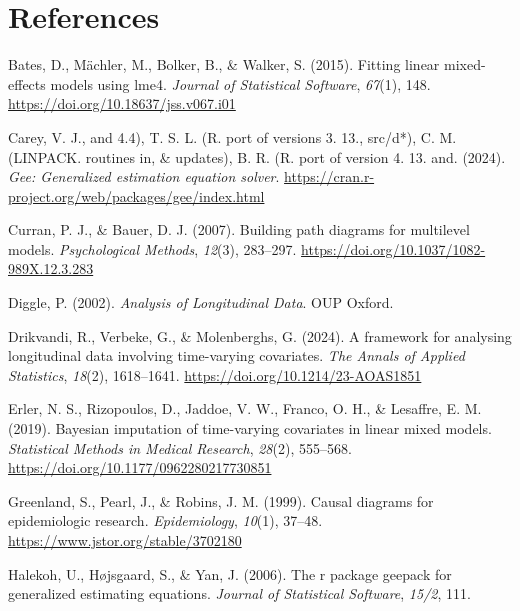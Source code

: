 \documentclass[
  12pt,
  a4paper,
]{article}
\newlength{\cslhangindent}
\newlength{\cslentryspacingunit} %
\newenvironment{CSLReferences}[2] %
 {%
  \setlength{\parindent}{0pt}
  \ifodd #1
  \let\oldpar\par
  \def\par{\hangindent=\cslhangindent\oldpar}
  \fi
  \setlength{\parskip}{#2\cslentryspacingunit}
 }%
 {}
\begin{document}
\newpage

\hypertarget{references}{%
\section{References}\label{references}}

\hypertarget{refs}{}
\begin{CSLReferences}{1}{0}
\leavevmode{}%
Bates, D., Mächler, M., Bolker, B., \& Walker, S. (2015). Fitting linear
mixed-effects models using {lme4}. \emph{Journal of Statistical
Software}, \emph{67}(1), 148.
\url{https://doi.org/10.18637/jss.v067.i01}

\leavevmode{}%
Carey, V. J., and 4.4), T. S. L. (R. port of versions 3. 13., src/d*),
C. M. (LINPACK. routines in, \& updates), B. R. (R. port of version 4.
13. and. (2024). \emph{Gee: Generalized estimation equation solver}.
\url{https://cran.r-project.org/web/packages/gee/index.html}

\leavevmode{}%
Curran, P. J., \& Bauer, D. J. (2007). Building path diagrams for
multilevel models. \emph{Psychological Methods}, \emph{12}(3), 283--297.
\url{https://doi.org/10.1037/1082-989X.12.3.283}

\leavevmode{}%
Diggle, P. (2002). \emph{Analysis of Longitudinal Data}. OUP Oxford.

\leavevmode{}%
Drikvandi, R., Verbeke, G., \& Molenberghs, G. (2024). A framework for
analysing longitudinal data involving time-varying covariates. \emph{The
Annals of Applied Statistics}, \emph{18}(2), 1618--1641.
\url{https://doi.org/10.1214/23-AOAS1851}

\leavevmode{}%
Erler, N. S., Rizopoulos, D., Jaddoe, V. W., Franco, O. H., \& Lesaffre,
E. M. (2019). Bayesian imputation of time-varying covariates in linear
mixed models. \emph{Statistical Methods in Medical Research},
\emph{28}(2), 555--568. \url{https://doi.org/10.1177/0962280217730851}

\leavevmode{}%
Greenland, S., Pearl, J., \& Robins, J. M. (1999). Causal diagrams for
epidemiologic research. \emph{Epidemiology}, \emph{10}(1), 37--48.
\url{https://www.jstor.org/stable/3702180}

\leavevmode{}%
Halekoh, U., Højsgaard, S., \& Yan, J. (2006). The r package geepack for
generalized estimating equations. \emph{Journal of Statistical
Software}, \emph{15/2}, 111.


\end{CSLReferences}
\end{document}
